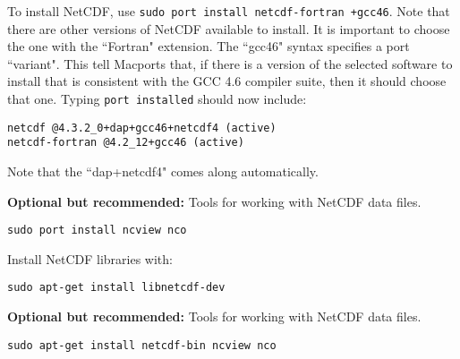 \begin{mdframed}[style=mac] %
To install NetCDF, use \texttt{sudo port install netcdf-fortran +gcc46}. 
Note that there are other versions of NetCDF available to install. It is important 
to choose the one with the ``Fortran" extension. The ``gcc46" syntax specifies a port ``variant". 
This tell Macports that, if there is a version of the selected software 
to install that is consistent with the GCC 4.6 compiler suite, then it should 
choose that one. Typing \texttt{port installed} should now include:

\begin{verbatim}
netcdf @4.3.2_0+dap+gcc46+netcdf4 (active)
netcdf-fortran @4.2_12+gcc46 (active)
\end{verbatim}

Note that the ``dap+netcdf4" comes along automatically. 

\textbf{Optional but recommended:} Tools for working with NetCDF data files.

\texttt{sudo port install ncview nco}

\end{mdframed}              %


\begin{mdframed}[style=ubuntu] %
Install NetCDF libraries with:

\texttt{sudo apt-get install libnetcdf-dev}

\textbf{Optional but recommended:} Tools for working with NetCDF data files.

\texttt{sudo apt-get install netcdf-bin ncview nco}
\end{mdframed}                 %



